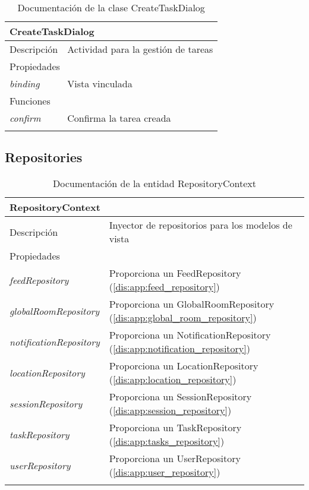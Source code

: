 \begin{longtable}{|p{} p{}|}
    \hline
    \multicolumn{2}{|l|}{\textbf{CreateTaskDialog}} \\ \hline \hline
    Descripción      & Actividad para la gestión de tareas \\ \hline
    \multicolumn{2}{|l|}{Propiedades} \\
    \emph{binding}  & Vista vinculada  \\ \hline
    \multicolumn{2}{|l|}{Funciones} \\
    \emph{confirm}  & Confirma la tarea creada  \\ \hline
    \caption{Documentación de la clase CreateTaskDialog}
    \label{dis:app:create_task_dialog}
\end{longtable}

\vspace{-30pt}
\subsection{Repositories}

\vspace{-10pt}
\begin{longtable}{|p{} p{}|}
    \hline
    \multicolumn{2}{|l|}{\textbf{RepositoryContext}} \\ \hline \hline
    Descripción      & Inyector de repositorios para los modelos de vista \\ \hline
    \multicolumn{2}{|l|}{Propiedades} \\
    \emph{feedRepository}  & Proporciona un FeedRepository (\ref{dis:app:feed_repository}) \\
    \emph{globalRoomRepository}  & Proporciona un GlobalRoomRepository (\ref{dis:app:global_room_repository})  \\
    \emph{notificationRepository}  & Proporciona un NotificationRepository (\ref{dis:app:notification_repository})  \\
    \emph{locationRepository}  & Proporciona un LocationRepository (\ref{dis:app:location_repository})  \\
    \emph{sessionRepository}  & Proporciona un SessionRepository (\ref{dis:app:session_repository})  \\
    \emph{taskRepository}  & Proporciona un TaskRepository (\ref{dis:app:tasks_repository})  \\
    \emph{userRepository}  & Proporciona un UserRepository (\ref{dis:app:user_repository})  \\ \hline
    \caption{Documentación de la entidad RepositoryContext}
    \label{dis:app:repository_context}
\end{longtable}

